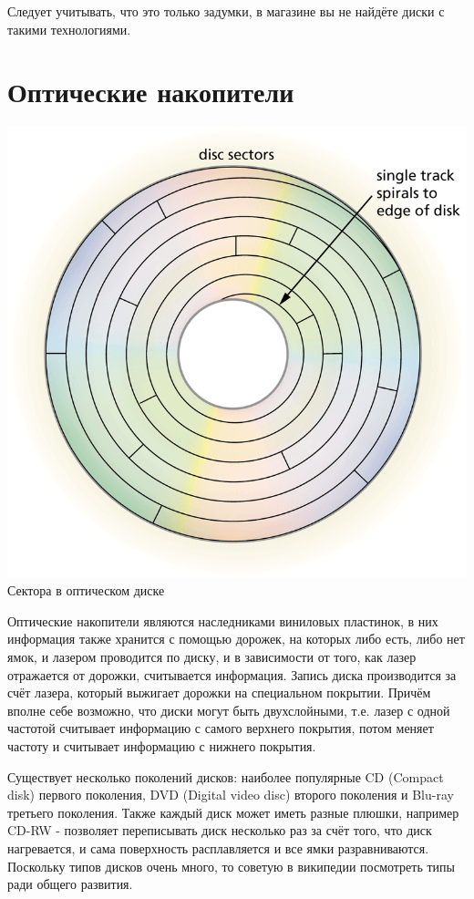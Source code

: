 \documentclass[12pt, a4paper]{article}
\begin{document}
Следует учитывать, что это только задумки, в магазине вы не найдёте диски с такими технологиями.

\section{Оптические накопители}

\begin{center}
{\includegraphics[scale=0.3]{./images/Optical.png} \\ Сектора в оптическом диске}
\end{center}

Оптические накопители являются наследниками виниловых пластинок, в них информация также хранится с помощью дорожек, на которых либо есть, либо нет ямок, и лазером проводится по диску, и в зависимости от того, как лазер отражается от дорожки, считывается информация. Запись диска производится за счёт лазера, который выжигает дорожки на специальном покрытии. Причём вполне себе возможно, что диски могут быть двухслойными, т.е. лазер с одной частотой считывает информацию с самого верхнего покрытия, потом меняет частоту и считывает информацию с нижнего покрытия.

Существует несколько поколений дисков: наиболее популярные CD (Compact disk) первого поколения, DVD (Digital video disc) второго поколения и Blu-ray третьего поколения. Также каждый диск может иметь разные плюшки, например CD-RW - позволяет переписывать диск несколько раз за счёт того, что диск нагревается, и сама поверхность расплавляется и все ямки разравниваются. Поскольку типов дисков очень много, то советую в википедии посмотреть типы ради общего развития.
   
\end{document}
